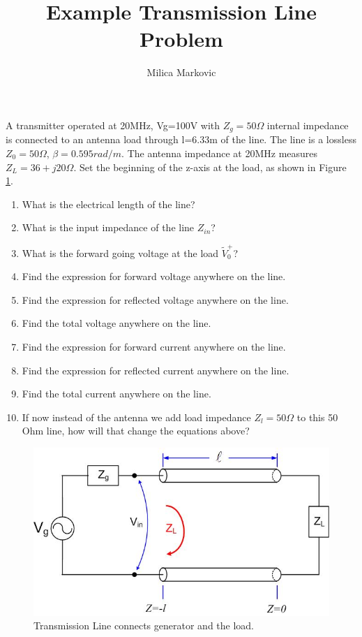 \documentclass{ximera}
\title{Example Transmission Line Problem}
\author{Milica Markovic}
\begin{document}
  
\begin{abstract}  

\end{abstract}  
\maketitle    


\begin{example}

A transmitter operated at 20MHz, Vg=100V with $Z_g=50 \Omega$ internal impedance is connected to an antenna load through l=6.33m of the line. The line is a lossless $Z_0=50 \Omega$, $\beta=0.595rad/m$. The antenna impedance at 20MHz measures $Z_L=36+j20 \Omega$. Set the beginning of the z-axis at the load, as shown in Figure \ref{fig:TRLine}.
\begin{enumerate}
\item What is the electrical length of the line? 
\item What is the input impedance of the line $Z_{in}$?
\item What is the forward going voltage at the load $\tilde{V}_0^+$?
\item Find the expression for forward voltage anywhere on the line.
\item Find the expression for reflected voltage anywhere on the line.
\item Find the total voltage anywhere on the line.
\item Find the expression for forward current anywhere on the line.
\item Find the expression for reflected current anywhere on the line.
\item Find the total current anywhere on the line.
\item If now instead of the antenna we add load impedance $Z_l=50 \Omega$ to this 50 Ohm line, how will that change the equations above?
\end{enumerate}




\begin{figure}[htbp]
\begin{center}
\includegraphics[scale=0.3]{../jpg/trline.jpg}
\end{center}
\caption{Transmission Line connects generator and the load.}
\label{fig:TRLine}
\end{figure}



\end{example}
\end{document}
